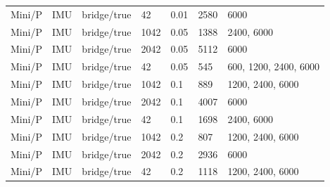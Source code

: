 {\begin{longtable}{@{}lllllll@{}}
Mini/P & IMU & bridge/true & 42 & 0.01 & 2580 & 6000 \\
Mini/P & IMU & bridge/true & 1042 & 0.05 & 1388 & 2400, 6000 \\
Mini/P & IMU & bridge/true & 2042 & 0.05 & 5112 & 6000 \\
Mini/P & IMU & bridge/true & 42 & 0.05 & 545 & 600, 1200, 2400, 6000 \\
Mini/P & IMU & bridge/true & 1042 & 0.1 & 889 & 1200, 2400, 6000 \\
Mini/P & IMU & bridge/true & 2042 & 0.1 & 4007 & 6000 \\
Mini/P & IMU & bridge/true & 42 & 0.1 & 1698 & 2400, 6000 \\
Mini/P & IMU & bridge/true & 1042 & 0.2 & 807 & 1200, 2400, 6000 \\
Mini/P & IMU & bridge/true & 2042 & 0.2 & 2936 & 6000 \\
Mini/P & IMU & bridge/true & 42 & 0.2 & 1118 & 1200, 2400, 6000 \\
\bottomrule
\end{longtable}}\par

